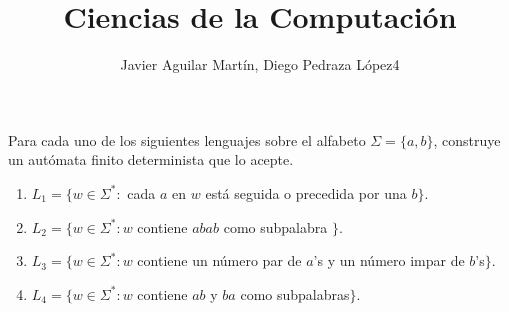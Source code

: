 \documentclass[twoside]{article}
\begin{document}
\title{Ciencias de la Computación}

\author{Javier Aguilar Martín, Diego Pedraza López4}
\maketitle

\begin{ejercicio}{1}
Para cada uno de los siguientes lenguajes sobre el alfabeto $\Sigma=\{a,b\}$, construye un autómata finito determinista que lo acepte. 
\begin{enumerate}
\item $L_1=\{w\in\Sigma^*:$ cada $a$ en $w$ está seguida o precedida por una $b\}$.
\item $L_2=\{w\in\Sigma^*: w$ contiene $abab$ como subpalabra $\}$.
\item $L_3= \{w\in\Sigma^*: w$ contiene un número par de $a$'s y un número impar de $b$'s$\}$.
\item $L_4= \{w\in\Sigma^*: w$ contiene $ab$ y $ba$ como subpalabras$\}$.
\end{enumerate}
\end{ejercicio}
\end{document}
